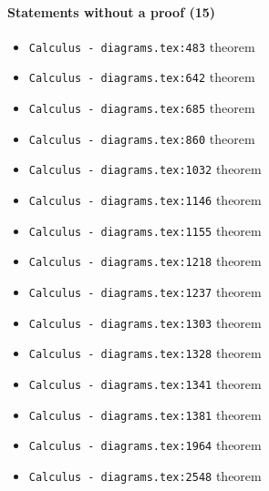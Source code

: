 \documentclass[11pt]{article}
\newcommand{\loc}[1]{{\small\color{muted}\texttt{#1}}}
\begin{document}
\paragraph{Statements without a proof (15)}
\begin{itemize}
\item \loc{Calculus - diagrams.tex:483} theorem
\item \loc{Calculus - diagrams.tex:642} theorem
\item \loc{Calculus - diagrams.tex:685} theorem
\item \loc{Calculus - diagrams.tex:860} theorem
\item \loc{Calculus - diagrams.tex:1032} theorem
\item \loc{Calculus - diagrams.tex:1146} theorem
\item \loc{Calculus - diagrams.tex:1155} theorem
\item \loc{Calculus - diagrams.tex:1218} theorem
\item \loc{Calculus - diagrams.tex:1237} theorem
\item \loc{Calculus - diagrams.tex:1303} theorem
\item \loc{Calculus - diagrams.tex:1328} theorem
\item \loc{Calculus - diagrams.tex:1341} theorem
\item \loc{Calculus - diagrams.tex:1381} theorem
\item \loc{Calculus - diagrams.tex:1964} theorem
\item \loc{Calculus - diagrams.tex:2548} theorem
\end{itemize}
\end{document}
